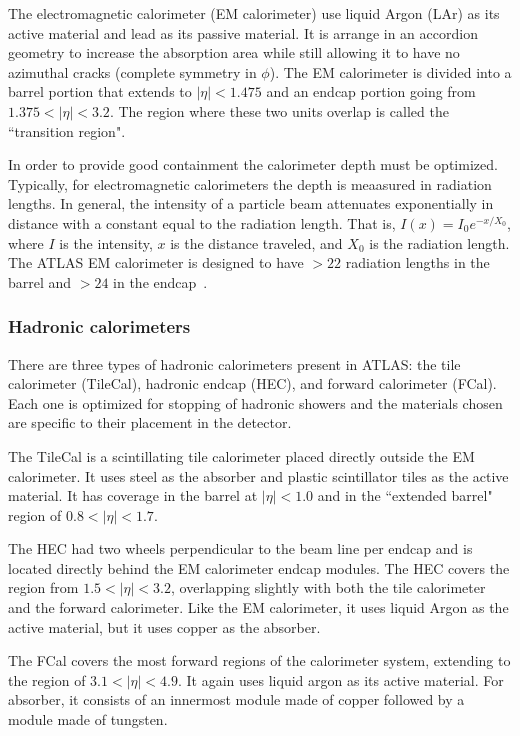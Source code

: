 The electromagnetic calorimeter (EM calorimeter) use liquid Argon (LAr) as its active material and lead as its passive material. It is arrange in an accordion geometry to increase the absorption area while still allowing it to have no azimuthal cracks (complete symmetry in $\phi$). The EM calorimeter is divided into a barrel portion that extends to $|\eta| < 1.475$ and an endcap portion going from $1.375 < |\eta| < 3.2$. The region where these two units overlap is called the ``transition region". 

In order to provide good containment the calorimeter depth must be optimized. Typically, for electromagnetic calorimeters the depth is meaasured in radiation lengths. In general, the intensity of a particle beam attenuates exponentially in distance with a constant equal to the radiation length. That is, $I(x) = I_0 e^{-x/X_0}$, where $I$ is the intensity, $x$ is the distance traveled, and $X_0$ is the radiation length. The ATLAS EM calorimeter is designed to have $>22$ radiation lengths in the barrel and $> 24$ in the endcap~\cite{ATLASPaper}. 

\subsubsection{Hadronic calorimeters}

There are three types of hadronic calorimeters present in ATLAS: the tile calorimeter (TileCal), hadronic endcap (HEC), and forward calorimeter (FCal). Each one is optimized for stopping of hadronic showers and the materials chosen are specific to their placement in the detector. 

The TileCal is a scintillating tile calorimeter placed directly outside the EM calorimeter. It uses steel as the absorber and plastic scintillator tiles as the active material. It has coverage in the barrel at $|\eta| < 1.0$ and in the ``extended barrel" region of $0.8 < |\eta| < 1.7$.

The HEC had two wheels perpendicular to the beam line per endcap and is located directly behind the EM calorimeter endcap modules. The HEC covers the region from $1.5 < |\eta| < 3.2$, overlapping slightly with both the tile calorimeter and the forward calorimeter. Like the EM calorimeter, it uses liquid Argon as the active material, but it uses copper as the absorber. 

The FCal covers the most forward regions of the calorimeter system, extending to the region of $3.1 < |\eta| < 4.9$. It again uses liquid argon as its active material. For absorber, it consists of an innermost module made of copper followed by a module made of tungsten. 

